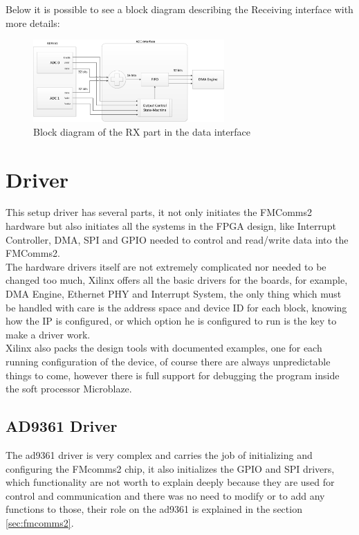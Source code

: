Below it is possible to see a block diagram describing the Receiving interface with
more details:

\begin{figure}[htbp]
    \centering
    \includegraphics[width=0.65\textwidth]{./figures/rxdata_if}
    \caption{ Block diagram of the RX part in the data interface
    \label{fig:dataifrx}}
\end{figure}

\section{Driver}
\label{impl:driver}

This setup driver has several parts, it not only initiates the FMComms2 hardware
but also initiates all the systems in the FPGA design, like Interrupt Controller,
 DMA, SPI and GPIO needed to control and read/write data into the FMComms2.\\

The hardware drivers itself are not extremely complicated nor needed to be changed
too much, Xilinx offers all the basic drivers for the boards, for example, DMA Engine,
Ethernet PHY and Interrupt System, the only thing which must be handled with care is
the address space and device ID for each block, knowing how the IP is configured,
or which option he is configured to run is the key to make a driver work.\\

Xilinx also packs the design tools with documented examples, one for each running
configuration of the device, of course there are always unpredictable things to come,
however there is full support for debugging the program inside the soft processor
Microblaze.

\subsection{AD9361 Driver}

The ad9361 driver is very complex and carries the job of initializing and
configuring the FMcomms2 chip, it also initializes the GPIO and SPI drivers,
which functionality are not worth to explain deeply because they are used for
control and communication and there was no need to modify or to add any
functions to those, their role on the ad9361 is explained in the section
\ref{sec:fmcomms2}.\\

